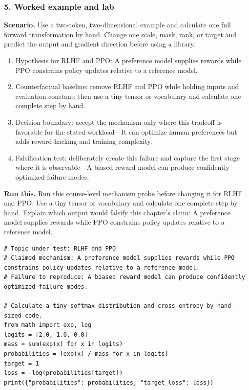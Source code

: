 \subsubsection*{5. Worked example and lab}
\textbf{Scenario.} Use a two-token, two-dimensional example and calculate one full forward transformation by hand. Change one scale, mask, rank, or target and predict the output and gradient direction before using a library.
\begin{enumerate}
\item Hypothesis for RLHF and PPO: A preference model supplies rewards while PPO constrains policy updates relative to a reference model.
\item Counterfactual baseline: remove RLHF and PPO while holding inputs and evaluation constant; then use a tiny tensor or vocabulary and calculate one complete step by hand.
\item Decision boundary: accept the mechanism only where this tradeoff is favorable for the stated workload—It can optimize human preferences but adds reward hacking and training complexity.
\item Falsification test: deliberately create this failure and capture the first stage where it is observable—A biased reward model can produce confidently optimized failure modes.
\end{enumerate}
\textbf{Run this.} Run this course-level mechanism probe before changing it for RLHF and PPO. Use a tiny tensor or vocabulary and calculate one complete step by hand. Explain which output would falsify this chapter's claim: A preference model supplies rewards while PPO constrains policy updates relative to a reference model.
\begin{Verbatim}[fontsize=\scriptsize]
# Topic under test: RLHF and PPO
# Claimed mechanism: A preference model supplies rewards while PPO constrains policy updates relative to a reference model.
# Failure to reproduce: A biased reward model can produce confidently optimized failure modes.

# Calculate a tiny softmax distribution and cross-entropy by hand-sized code.
from math import exp, log
logits = [2.0, 1.0, 0.0]
mass = sum(exp(x) for x in logits)
probabilities = [exp(x) / mass for x in logits]
target = 1
loss = -log(probabilities[target])
print({"probabilities": probabilities, "target_loss": loss})
\end{Verbatim}
